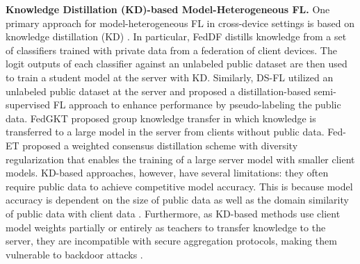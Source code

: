 \documentclass{article}
\begin{document}
\textbf{Knowledge Distillation (KD)-based Model-Heterogeneous FL.}
One primary approach for model-heterogeneous FL in cross-device settings is based on knowledge distillation (KD) \citep{hinton2015distilling}.
In particular, FedDF \cite{lin2020ensemble} distills knowledge from a set of classifiers trained with private data from a federation of client devices. The logit outputs of each classifier against an unlabeled public dataset are then used to train a student model at the server with KD. 
%
Similarly, DS-FL \citep{itahara2020distillation} utilized an unlabeled public dataset at the server and proposed a distillation-based semi-supervised FL approach to enhance performance by pseudo-labeling the public data.
%
%
FedGKT \cite{he2020group} proposed group knowledge transfer in which knowledge is transferred to a large model in the server from clients without public data.
%
Fed-ET \citep{cho2022heterogeneous} proposed a weighted consensus distillation scheme with diversity regularization that enables the training of a large server model with smaller client models. 
%
KD-based approaches, however, have several limitations: 
%
they often require public data to achieve competitive model accuracy. This is because model accuracy is dependent on the size of public data as well as the domain similarity of  public data with  client data \cite{lin2020ensemble, cho2022heterogeneous, stanton2021does}. Furthermore, as KD-based methods use client model weights partially or entirely as teachers to transfer knowledge to the server, they are incompatible with secure aggregation protocols, making them vulnerable to backdoor attacks \cite{wang2020attack}.
\end{document}
